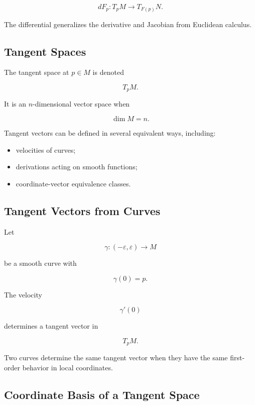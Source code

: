 \[
\boxed{
dF_p:T_pM\to T_{F(p)}N.
}
\]

The differential generalizes the derivative and Jacobian from Euclidean
calculus.

\subsection{Tangent Spaces}
\label{subsec:tangent-spaces-manifolds}

The tangent space at \(p\in M\) is denoted

\[
\boxed{
T_pM.
}
\]

It is an \(n\)-dimensional vector space when

\[
\dim M=n.
\]

Tangent vectors can be defined in several equivalent ways, including:

\begin{itemize}
    \item velocities of curves;
    \item derivations acting on smooth functions;
    \item coordinate-vector equivalence classes.
\end{itemize}

\subsection{Tangent Vectors from Curves}
\label{subsec:tangent-vectors-curves}

Let

\[
\gamma:(-\varepsilon,\varepsilon)\to M
\]

be a smooth curve with

\[
\gamma(0)=p.
\]

The velocity

\[
\boxed{
\gamma'(0)
}
\]

determines a tangent vector in

\[
T_pM.
\]

Two curves determine the same tangent vector when they have the same
first-order behavior in local coordinates.

\subsection{Coordinate Basis of a Tangent Space}
\label{subsec:coordinate-basis-tangent}

